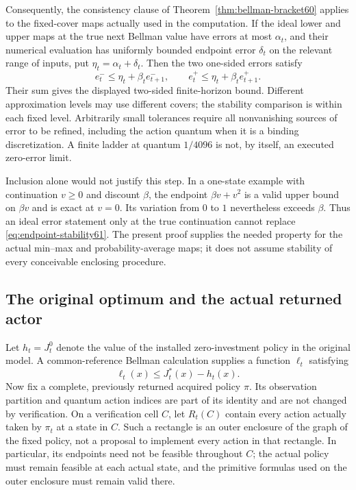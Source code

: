 Consequently, the consistency clause of Theorem~\ref{thm:bellman-bracket60} applies to the fixed-cover maps actually used in the computation. If the ideal lower and upper maps at the true next Bellman value have errors at most $\alpha_t$, and their numerical evaluation has uniformly bounded endpoint error $\delta_t$ on the relevant range of inputs, put $\eta_t=\alpha_t+\delta_t$. Then the two one-sided errors satisfy
\[
 e_t^-\le\eta_t+\beta_te_{t+1}^- ,\qquad
 e_t^+\le\eta_t+\beta_te_{t+1}^+ .
\]
Their sum gives the displayed two-sided finite-horizon bound. Different approximation levels may use different covers; the stability comparison is within each fixed level. Arbitrarily small tolerances require all nonvanishing sources of error to be refined, including the action quantum when it is a binding discretization. A finite ladder at quantum $1/4096$ is not, by itself, an executed zero-error limit.

Inclusion alone would not justify this step. In a one-state example with continuation $v\ge0$ and discount $\beta$, the endpoint $\beta v+v^2$ is a valid upper bound on $\beta v$ and is exact at $v=0$. Its variation from $0$ to $1$ nevertheless exceeds $\beta$. Thus an ideal error statement only at the true continuation cannot replace \eqref{eq:endpoint-stability61}. The present proof supplies the needed property for the actual min--max and probability-average maps; it does not assume stability of every conceivable enclosing procedure.

\subsection{The original optimum and the actual returned actor}
Let $h_t=J_t^0$ denote the value of the installed zero-investment policy in the original model. A common-reference Bellman calculation supplies a function $\ell_t$ satisfying
\[
 \ell_t(x)\le J_t^*(x)-h_t(x).
\]
Now fix a complete, previously returned acquired policy $\pi$. Its observation partition and quantum action indices are part of its identity and are not changed by verification. On a verification cell $C$, let $R_t(C)$ contain every action actually taken by $\pi_t$ at a state in $C$. Such a rectangle is an outer enclosure of the graph of the fixed policy, not a proposal to implement every action in that rectangle. In particular, its endpoints need not be feasible throughout $C$; the actual policy must remain feasible at each actual state, and the primitive formulas used on the outer enclosure must remain valid there.

